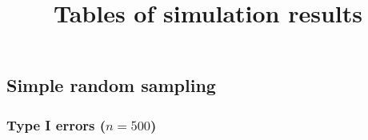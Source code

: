 \documentclass[
]{article}
\title{Tables of simulation results}
\author{}
\date{\vspace{-2.5em}}
\begin{document}
\maketitle

{
\setcounter{tocdepth}{3}
\tableofcontents
}
\hypertarget{simple-random-sampling}{%
\subsection{Simple random sampling}\label{simple-random-sampling}}

\hypertarget{type-i-errors-n500}{%
\subsubsection{\texorpdfstring{Type I errors
(\(n=500\))}{Type I errors (n=500)}}\label{type-i-errors-n500}}
\end{document}
